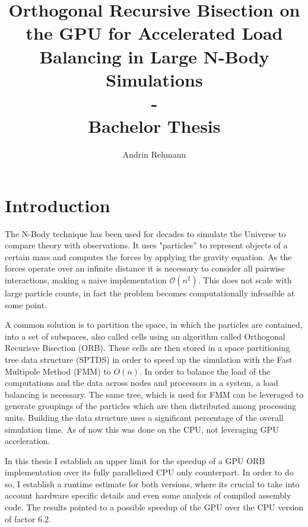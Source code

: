 \documentclass[]{article}
\title{Orthogonal Recursive Bisection on the GPU for Accelerated Load Balancing in Large N-Body Simulations \\ - \\ Bachelor Thesis}
\author{Andrin Rehmann}
\begin{document}
\maketitle

\newpage

\tableofcontents

\newpage
\section{Introduction}


The N-Body technique has been used for decades to simulate the Universe to compare theory with observations. It uses "particles'' to represent objects of a certain mass and computes the forces by applying the gravity equation. As the forces operate over an infinite distance it is necessary to consider all pairwise interactions, making a naive implementation $\mathcal{O}(n^2)$. This does not scale with large particle counts, in fact the problem becomes computationally infeasible at some point.

A common solution is to partition the space, in which the particles are contained, into a set of subspaces, also called cells using an algorithm called Orthogonal Recurisve Bisection (ORB). These cells are then stored in a space partitioning tree data structure (SPTDS) in order to speed up the simulation with the Fast Multipole Method (FMM) to $O(n)$. In order to balance the load of the computations and the data across nodes and processors in a system, a load balancing is necessary. The same tree, which is used for FMM can be leveraged to generate groupings of the particles which are then distributed among processing units.
Building the data structure uses a significant percentage of the overall simulation time. As of now this was done on the CPU, not leveraging GPU acceleration.
 
In this thesis I establish an upper limit for the speedup of a GPU ORB implementation over its fully parallelized CPU only counterpart. In order to do so, I establish a runtime estimate for both versions, where its crucial to take into account hardware specific details and even some analysis of compiled assembly code. The results pointed to a possible speedup of the GPU over the CPU version of factor $6.2$.
\end{document}
